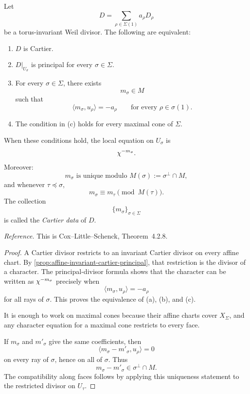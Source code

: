 \begin{theorem}
\label{thm:toric-cartier-criterion}
Let
\[
D=\sum_{\rho\in\Sigma(1)}a_\rho D_\rho
\]
be a torus-invariant Weil divisor. The following are equivalent:

\begin{enumerate}[label=(\alph*),wide=0pt]
\item \(D\) is Cartier.

\item \(D|_{U_\sigma}\) is principal for every \(\sigma\in\Sigma\).

\item For every \(\sigma\in\Sigma\), there exists
\[
m_\sigma\in M
\]
such that
\[
\langle m_\sigma,u_\rho\rangle=-a_\rho
\qquad
\text{for every }\rho\in\sigma(1).
\]

\item The condition in \textup{(c)} holds for every maximal cone of
\(\Sigma\).
\end{enumerate}

When these conditions hold, the local equation on \(U_\sigma\) is
\[
\chi^{-m_\sigma}.
\]
Moreover:
\[
m_\sigma
\text{ is unique modulo }
M(\sigma):=\sigma^\perp\cap M,
\]
and whenever \(\tau\preceq\sigma\),
\[
m_\sigma\equiv m_\tau\pmod{M(\tau)}.
\]
The collection
\[
\{m_\sigma\}_{\sigma\in\Sigma}
\]
is called the \emph{Cartier data} of \(D\).
\end{theorem}

\noindent
\textit{Reference.}
This is Cox--Little--Schenck, Theorem~4.2.8.

\begin{proof}
A Cartier divisor restricts to an invariant Cartier divisor on every
affine chart. By
\cref{prop:affine-invariant-cartier-principal}, that restriction is
the divisor of a character. The principal-divisor formula shows that
the character can be written as \(\chi^{-m_\sigma}\) precisely
when
\[
\langle m_\sigma,u_\rho\rangle=-a_\rho
\]
for all rays of \(\sigma\). This proves the equivalence of
\textup{(a)}, \textup{(b)}, and \textup{(c)}.

It is enough to work on maximal cones because their affine charts
cover \(X_\Sigma\), and any character equation for a maximal cone
restricts to every face.

If \(m_\sigma\) and \(m'_\sigma\) give the same coefficients, then
\[
\langle m_\sigma-m'_\sigma,u_\rho\rangle=0
\]
on every ray of \(\sigma\), hence on all of \(\sigma\). Thus
\[
m_\sigma-m'_\sigma\in\sigma^\perp\cap M.
\]
The compatibility along faces follows by applying this uniqueness
statement to the restricted divisor on \(U_\tau\).
\end{proof}

